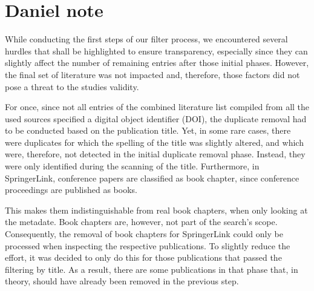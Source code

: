 \documentclass{article}
\theoremstyle{mytheoremstyle}
\theoremstyle{mytheoremstyle}
\theoremstyle{myproblemstyle}
\begin{document}
    \section{Daniel note}

    While conducting the first steps of our filter process, we encountered several hurdles that shall be highlighted to ensure transparency, especially since they can slightly affect the number of remaining entries after those initial phases. However, the final set of literature was not impacted and, therefore, those factors did not pose a threat to the studies validity.

For once, since not all entries of the combined literature list compiled from all the used sources specified a digital object identifier (DOI), the duplicate removal had to be conducted based on the publication title. Yet, in some rare cases, there were duplicates for which the spelling of the title was slightly altered, and which were, therefore, not detected in the initial duplicate removal phase. Instead, they were only identified during the scanning of the title. Furthermore, in SpringerLink, conference papers are classified as book chapter, since conference proceedings are published as books.

This makes them indistinguishable from real book chapters, when only looking at the metadate. Book chapters are, however, not part of the search’s scope. Consequently, the removal of book chapters for SpringerLink could only be processed when inspecting the respective publications. To slightly reduce the effort, it was decided to only do this for those publications that passed the filtering by title. As a result, there are some publications in that phase that, in theory, should have already been removed in the previous step.


 
\end{document}
